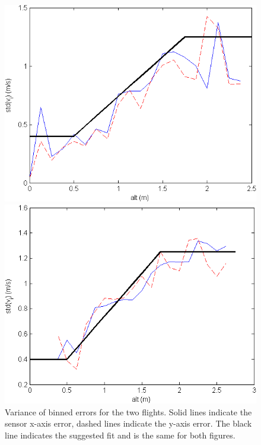 \documentclass{article}
\begin{document}
\begin{figure}[tb!]
\centering
\begin{minipage}{0.49\textwidth}
\includegraphics[width=\textwidth]{../../sensor characterization/flow figures/resids_v_alt1_bins.png}
\end{minipage}
\begin{minipage}{0.49\textwidth}
\includegraphics[width=\textwidth]{../../sensor characterization/flow figures/resids_v_alt2_bins.png}
\end{minipage}
\caption{Variance of binned errors for the two flights. Solid lines indicate the sensor x-axis error, dashed lines indicate the y-axis error. The black line indicates the suggested fit and is the same for both figures.}
\label{fig:resids_v_alt_bins}
\end{figure}
\end{document}
